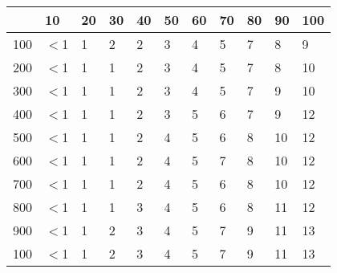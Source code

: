 \documentclass{article}
\begin{document}
\begin{center}
\begin{table}
\begin{tabularx}{0.8\textwidth}{|X|X|X|X|X|X|X|X|X|X|X|}
\hline &10&20&30&40&50&60&70&80&90&100\\
\hline 100&$<$1&1&2&2&3&4&5&7&8&9\\
\hline 200&$<$1&1&1&2&3&4&5&7&8&10\\
\hline 300&$<$1&1&1&2&3&4&5&7&9&10\\
\hline 400&$<$1&1&1&2&3&5&6&7&9&12\\
\hline 500&$<$1&1&1&2&4&5&6&8&10&12\\
\hline 600&$<$1&1&1&2&4&5&7&8&10&12\\
\hline 700&$<$1&1&1&2&4&5&6&8&10&12\\
\hline 800&$<$1&1&1&3&4&5&6&8&11&12\\
\hline 900&$<$1&1&2&3&4&5&7&9&11&13\\
\hline 100&$<$1&1&2&3&4&5&7&9&11&13\\
\hline
\end{tabularx}
\end{table}
\end{center}
\end{document}
